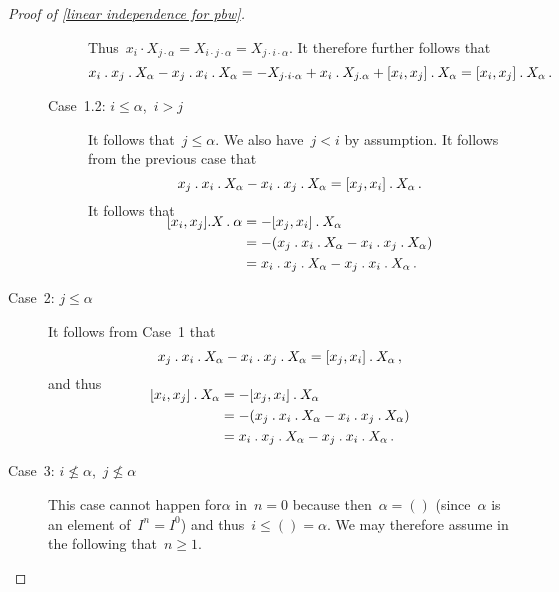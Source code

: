 \begin{proof}[Proof of \cref{linear independence for pbw}]
\begin{description}
\begin{description}
          Thus~$x_i \cdot X_{j \cdot \alpha} = X_{i \cdot j \cdot \alpha} = X_{j \cdot i \cdot \alpha}$.
          It therefore further follows that
          \[
            x_i \mathbin{.} x_j \mathbin{.} X_\alpha - x_j \mathbin{.} x_i \mathbin{.} X_\alpha
            =
            - X_{j \cdot i \cdot \alpha}
            + x_i \mathbin{.} X_{j \mathbin{.} \alpha}
            + [x_i, x_j] \mathbin{.} X_\alpha
            =
            [x_i, x_j] \mathbin{.} X_\alpha \,.
          \]
        \item[Case~1.2: $i \leq \alpha$,~$i > j$]
          It follows that~$j \leq \alpha$.
          We also have~$j < i$ by assumption.
          It follows from the previous case that
          \[
            x_j \mathbin{.} x_i \mathbin{.} X_\alpha - x_i \mathbin{.} x_j \mathbin{.} X_\alpha
            =
            [x_j, x_i] \mathbin{.} X_\alpha \,.
          \]
          It follows that
          \begin{align*}
            \SwapAboveDisplaySkip
            [x_i, x_j].X \act \alpha
            &=
            -[x_j, x_i] \act X_\alpha
            \\
            &=
            - (x_j \act x_i \act X_\alpha - x_i \act x_j \act X_\alpha)
            \\
            &=
            x_i \act x_j \act X_\alpha - x_j \act x_i \act X_\alpha \,.
          \end{align*}
      \end{description}
    \item[Case~2: $j \leq \alpha$]
      \label{second element is smaller than monomial}
      It follows from Case~1 that
      \[
        x_j \mathbin{.} x_i \mathbin{.} X_\alpha - x_i \mathbin{.} x_j \mathbin{.} X_\alpha
        =
        [x_j, x_i] \mathbin{.} X_\alpha \,,
      \]
      and thus
      \begin{align*}
        \SwapAboveDisplaySkip
        [x_i, x_j] \act X_\alpha
        &=
        -[x_j, x_i] \act X_\alpha
        \\
        &=
        - (x_j \act x_i \act X_\alpha - x_i \act x_j \act X_\alpha)
        \\
        &=
        x_i \act x_j \act X_\alpha - x_j \act x_i \act X_\alpha \,.
      \end{align*}
    \item[Case~3: $i \nleq \alpha$,~$j \nleq \alpha$]
      This case cannot happen for$\alpha$ in~$n = 0$ because then~$\alpha = ()$ (since~$\alpha$ is an element of~$I^n = I^0$) and thus~$i \leq () = \alpha$.
      We may therefore assume in the following that~$n \geq 1$.


\end{description}
\end{proof}
